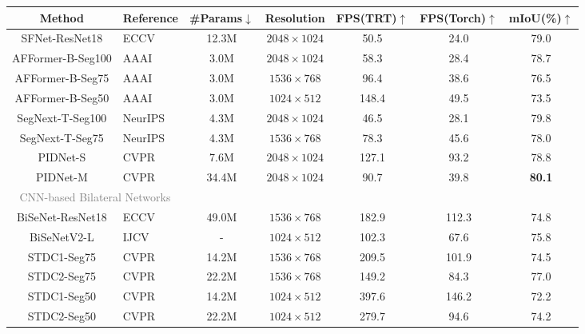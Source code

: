 \documentclass[letterpaper]{article} %
\begin{document}
\begin{table}[t]
    \centering
  \begin{tabular}{c l|c|c|c|c|c}%
    \Xhline{1pt}
    Method & Reference &\#Params$\downarrow$ &Resolution &FPS(TRT)$\uparrow$ &FPS(Torch)$\uparrow$ &mIoU(\%)$\uparrow$ \\
    \hline
    SFNet-ResNet18  &ECCV~\citeyear{li2020semantic} &12.3M  &$2048 \times 1024$ &50.5 &24.0 &79.0  \\
    AFFormer-B-Seg100 &AAAI~\citeyear{dong2023afformer} &3.0M &$2048 \times 1024$ &58.3 &28.4 &78.7 \\
    AFFormer-B-Seg75  &AAAI~\citeyear{dong2023afformer} &3.0M &$1536 \times 768$ &96.4 &38.6 &76.5 \\
    AFFormer-B-Seg50  &AAAI~\citeyear{dong2023afformer} &3.0M &$1024 \times 512$ &148.4 &49.5 &73.5 \\
    SegNext-T-Seg100 &NeurIPS~\citeyear{guo2022segnext} &4.3M &$2048 \times 1024$ &46.5 &28.1 &79.8 \\
    SegNext-T-Seg75  &NeurIPS~\citeyear{guo2022segnext} &4.3M &$1536 \times 768$ &78.3 &45.6 &78.0 \\
    PIDNet-S  &CVPR~\citeyear{xu2023pidnet}  &7.6M &$2048 \times 1024$ &127.1 &93.2 &78.8 \\   
    PIDNet-M  &CVPR~\citeyear{xu2023pidnet}  &34.4M &$2048 \times 1024$ &90.7 &39.8 &\textbf{80.1} \\    
    \hline
    \multicolumn{2}{c|}{\textcolor{gray}{CNN-based Bilateral Networks}} & &  & & &\\
    BiSeNet-ResNet18  &ECCV~\citeyear{yu2018bisenet}  &49.0M  &$1536 \times 768$     &182.9 &112.3 &74.8  \\
    BiSeNetV2-L      &IJCV~\citeyear{yu2021bisenet}   &-      &$1024 \times 512$    &102.3 &67.6    &75.8   \\
    STDC1-Seg75 &CVPR~\citeyear{fan2021rethinking} &14.2M &$1536 \times 768$ &209.5 &101.9 &74.5 \\
    STDC2-Seg75 &CVPR~\citeyear{fan2021rethinking} &22.2M &$1536 \times 768$ &149.2 &84.3  &77.0 \\
    STDC1-Seg50 &CVPR~\citeyear{fan2021rethinking} &14.2M &$1024 \times 512$ &397.6 &146.2 &72.2 \\
    STDC2-Seg50 &CVPR~\citeyear{fan2021rethinking} &22.2M &$1024 \times 512$ &279.7 &94.6  &74.2 \\

\end{tabular}
\end{table}
\end{document}
